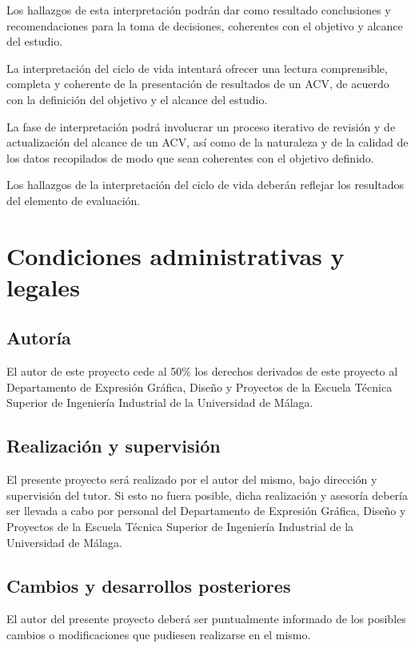Los hallazgos de esta interpretación podrán dar como resultado conclusiones y recomendaciones para la toma de decisiones, coherentes con el objetivo y alcance del estudio.

La interpretación del ciclo de vida intentará ofrecer una lectura comprensible, completa y coherente de la presentación de resultados de un ACV, de acuerdo con la definición del objetivo y el alcance del estudio.

La fase de interpretación podrá involucrar un proceso iterativo de revisión y de actualización del alcance de un ACV, así como de la naturaleza y de la calidad de los datos recopilados de modo que sean coherentes con el objetivo definido.

Los hallazgos de la interpretación del ciclo de vida deberán reflejar los resultados del elemento de evaluación.

\chapter{Condiciones administrativas y legales}

\section{Autoría}
El autor de este proyecto cede al 50\% los derechos derivados de este proyecto al Departamento de Expresión Gráfica, Diseño y Proyectos de la Escuela Técnica Superior de Ingeniería Industrial de la Universidad de Málaga.

\section{Realización y supervisión}
El presente proyecto será realizado por el autor del mismo, bajo dirección y supervisión del tutor. Si esto no fuera posible, dicha realización y asesoría debería ser llevada a cabo por personal del Departamento de Expresión Gráfica, Diseño y Proyectos de la Escuela Técnica Superior de Ingeniería Industrial de la Universidad de Málaga.

\section{Cambios y desarrollos posteriores}
El autor del presente proyecto deberá ser puntualmente informado de los posibles cambios o modificaciones que pudiesen realizarse en el mismo.

